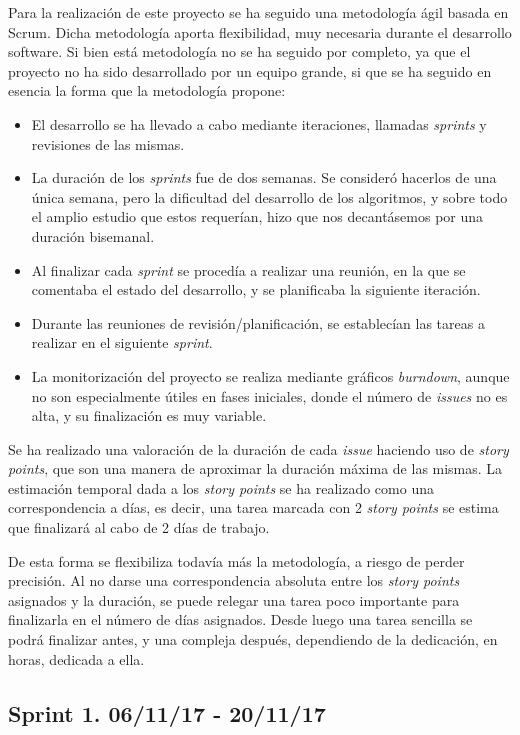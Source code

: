 Para la realización de este proyecto se ha seguido una metodología ágil basada en Scrum. Dicha metodología aporta flexibilidad, muy necesaria durante el desarrollo software. 
Si bien está metodología no se ha seguido por completo, ya que el proyecto no ha sido desarrollado por un equipo grande, si que se ha seguido en esencia la forma que la metodología propone:
\begin{itemize}
\item El desarrollo se ha llevado a cabo mediante iteraciones, llamadas \emph{sprints} y revisiones de las mismas.
\item La duración de los \emph{sprints} fue de dos semanas. Se consideró hacerlos de una única semana, pero la dificultad del desarrollo de los algoritmos, y sobre todo el amplio estudio que estos requerían,  hizo que nos decantásemos por una duración bisemanal.
\item Al finalizar cada \emph{sprint} se procedía a realizar una reunión, en la que se comentaba el estado del desarrollo, y se planificaba la siguiente iteración. 
\item Durante las reuniones de revisión/planificación, se establecían las tareas a realizar en el siguiente \emph{sprint}.
\item La monitorización del proyecto se realiza mediante gráficos \emph{burndown}, aunque no son especialmente útiles en fases iniciales, donde el número de \emph{issues} no es alta, y su finalización es muy variable.
\end{itemize}

Se ha realizado una valoración de la duración de cada \emph{issue} haciendo uso de \emph{story points}, que son una manera de aproximar la duración máxima de las mismas.
La estimación temporal dada a los \emph{story points} se ha realizado como una correspondencia a días, es decir, una tarea marcada con 2 \emph{story points} se estima que finalizará al cabo de 2 días de trabajo.

De esta forma se flexibiliza todavía más la metodología, a riesgo de perder precisión. Al no darse una correspondencia absoluta entre los \emph{story points} asignados y la duración, se puede relegar una tarea poco importante para finalizarla en el número de días asignados. Desde luego una tarea sencilla se podrá finalizar antes, y una compleja después, dependiendo de la dedicación, en horas, dedicada a ella.


\subsection{Sprint 1. 06/11/17 - 20/11/17}

